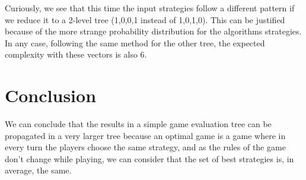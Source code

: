 \documentclass[a4paper,10pt]{article}
\begin{document}
Curiously, we see that this time the input strategies follow a different pattern
if we reduce it to a 2-level tree (1,0,0,1 instead of 1,0,1,0). This can be justified because
of the more strange probability distribution for the algorithms strategies. In any case,
following the same method for the other tree, the expected complexity with these vectors
is also $6$.

\section{Conclusion}

We can conclude that the results in a simple game evaluation tree can be propagated
in a very larger tree because an optimal game is a game where in every turn the players
choose the same strategy, and as the rules of the game don't change while playing, we can
consider that the set of best strategies is, in average, the same. 
\end{document}

